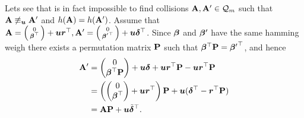 Lets see that is in fact impossible to find collisions $\mathbf{{A}},\mathbf{{A}}'\in\mathcal{Q}_m$ such that $\mathbf{{A}}\not\equiv_{\boldsymbol{u}}\mathbf{{A}}'$ and $h(\mathbf{{A}})=h(\mathbf{{A}}')$. Assume that $\mathbf{{A}}=\left(\begin{smallmatrix}0\\{\boldsymbol{\beta}}^\top\end{smallmatrix}\right)+{\boldsymbol{u}}{\boldsymbol{r}}^\top,\mathbf{{A}}'=\left(\begin{smallmatrix}0\\{{\boldsymbol{\beta}}'}^\top\end{smallmatrix}\right)+{\boldsymbol{u}}{\boldsymbol{\delta}}^\top$. Since ${\boldsymbol{\beta}}$ and ${\boldsymbol{\beta}}'$ have the same hamming weigh there exists a permutation matrix $\mathbf{{P}}$ such that ${\boldsymbol{\beta}}^\top\mathbf{{P}} = {{\boldsymbol{\beta}}'}^\top$, and hence
\begin{align*}
\mathbf{{A}}' &= \left(\begin{matrix}0\\{\boldsymbol{\beta}}^\top\mathbf{{P}}\end{matrix}\right) + {\boldsymbol{u}}{\boldsymbol{\delta}} + {\boldsymbol{u}}{\boldsymbol{r}}^\top\mathbf{{P}} - {\boldsymbol{u}}{\boldsymbol{r}}^\top\mathbf{{P}}\\
&=
 \left(\left(\begin{matrix}0\\{\boldsymbol{\beta}}^\top\end{matrix}\right) + {\boldsymbol{u}}{\boldsymbol{r}}^\top \right)\mathbf{{P}} + {\boldsymbol{u}}({\boldsymbol{\delta}}^\top-{\boldsymbol{r}}^\top\mathbf{{P}})\\
 &=
 \mathbf{{A}}\mathbf{{P}} + {\boldsymbol{u}}\tilde{{\boldsymbol{\delta}}}^\top.
\end{align*}

